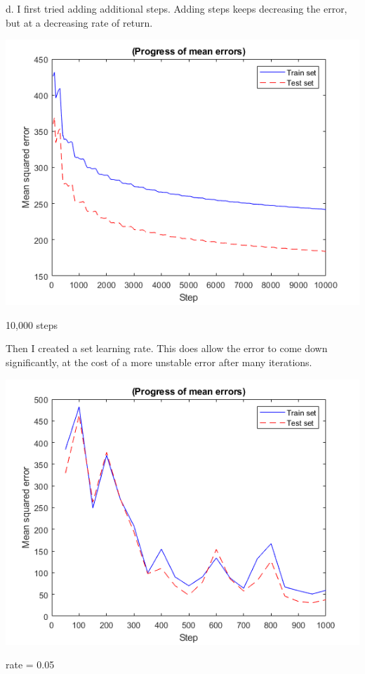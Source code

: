 \documentclass[a4paper]{article}
\begin{document}
\noindent
d. I first tried adding additional steps. Adding steps keeps decreasing the error, but at a decreasing rate of return.

\begin{center}
    \includegraphics[scale=1]{3d-1.png}
    \caption{10,000 steps}
\end{center}

\noindent
Then I created a set learning rate. This does allow the error to come down significantly, at the cost of a more unstable error after many iterations.

\begin{center}
    \includegraphics[scale=1]{3d-2.png}
    \caption{rate = 0.05}
\end{center}
\end{document}
